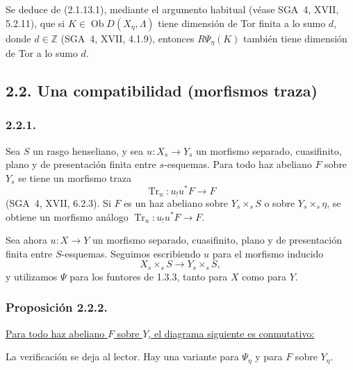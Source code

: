 Se deduce de (2.1.13.1), mediante el argumento habitual (véase SGA~4, XVII,
5.2.11), que si $K\in\operatorname{Ob}D(X_\eta,\Lambda)$ tiene dimensión de
Tor finita a lo sumo $d$, donde $d\in\mathbb Z$ (SGA~4, XVII, 4.1.9),
entonces $R\Psi_\eta(K)$ también tiene dimensión de Tor a lo sumo $d$.

\subsection*{2.2. Una compatibilidad (morfismos traza)}

\subsubsection*{2.2.1.}
Sea $S$ un rasgo henseliano, y sea
$u:X_s\longrightarrow Y_s$ un morfismo separado, cuasifinito, plano y de
presentación finita entre $s$-esquemas. Para todo haz abeliano $F$ sobre
$Y_s$ se tiene un morfismo traza
\[
\operatorname{Tr}_u:u_!u^*F\longrightarrow F
\]
(SGA~4, XVII, 6.2.3). Si $F$ es un haz abeliano sobre $Y_s\times_sS$ o sobre
$Y_s\times_s\eta$, se obtiene un morfismo análogo
$\operatorname{Tr}_u:u_!u^*F\longrightarrow F$.

Sea ahora $u:X\longrightarrow Y$ un morfismo separado, cuasifinito, plano y
de presentación finita entre $S$-esquemas. Seguimos escribiendo $u$ para el
morfismo inducido
\[
X_s\times_sS\longrightarrow Y_s\times_sS,
\]
y utilizamos $\Psi$ para los funtores de 1.3.3, tanto para $X$ como para $Y$.

\subsubsection*{Proposición 2.2.2.}
\underline{Para todo haz abeliano $F$ sobre $Y$, el diagrama siguiente es
conmutativo:}
\begin{center}
\end{center}
\pageoriginale

La verificación se deja al lector. Hay una variante para $\Psi_\eta$ y para
$F$ sobre $Y_\eta$.

